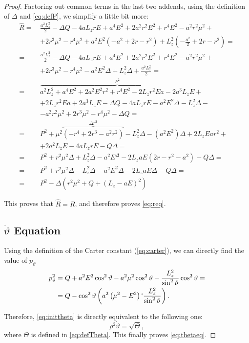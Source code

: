 \begin{proof}
	Factoring out common terms in the last two addends, using the definition of $\Delta$ and \autoref{eq:defP}, we simplify a little bit more:
	\begin{align}
	\widehat{R} =\,& \frac{a^2L_z^2}{2} - \Delta Q - 4aL_zrE + a^4E^2 + 2a^2r^2E^2 + r^4E^2 - a^2r^2\mu^2 + \nonumber \\
	&+ 2r^3\mu^2 - r^4\mu^2 + a^2E^2\left(-a^2 + 2r - r^2 \right) + L_z^2\left( -\frac{a^2}{2} + 2r - r^2 \right) = \nonumber \\
	=\,& \frac{a^2L_z^2}{2} - \Delta Q - 4aL_zrE + a^4E^2 + 2a^2r^2E^2 + r^4E^2 - a^2r^2\mu^2 + \nonumber \\
	&+ 2r^3\mu^2 - r^4\mu^2 - a^2E^2\Delta + L_z^2\Delta + \frac{a^2L_z^2}{2} = \nonumber \\
	=\,& \overbrace{a^2L_z^2 + a^4E^2 + 2a^2E^2r^2 + r^4E^2 - 2L_zr^2Ea - 2a^3L_zE}^{P^2} + \nonumber\\
	&+ 2L_zr^2Ea + 2a^3L_zE - \Delta Q - 4aL_zrE - a^2E^2\Delta - L_z^2\Delta - \nonumber \\
	&- a^2r^2\mu^2 + 2r^3\mu^2 - r^4\mu^2 - \Delta Q = \nonumber \\
	=\,& P^2 + \mu^2\overbrace{\left( -r^4 + 2r^3 - a^2r^2 \right)}^{\Delta r^2} - L_z^2\Delta - (a^2E^2)\Delta + 2L_zEar^2 + \nonumber\\
	&+ 2a^2L_zE - 4aL_zrE - Q\Delta = \nonumber\\
	=\,& P^2 + r^2\mu^2\Delta + L_z^2\Delta - a^2E^\Delta - 2L_zaE\left(2r - r^2 - a^2\right) - Q\Delta = \nonumber\\
	=\,& P^2 + r^2\mu^2\Delta - L_z^2 \Delta - a^2E^2\Delta - 2L_zaE\Delta - Q\Delta = \nonumber \\
	=\,& P^2 - \Delta \left( r^2\mu^2 + Q + \left(L_z - aE \right)^2 \right)
	\end{align}
	
	This proves that $\widehat{R} = R$, and therefore proves \autoref{eq:req}.
	
	\subsection*{$\dot{\vartheta}$ Equation}
	
	Using the definition of the Carter constant (\autoref{eq:carter}), we can directly find the value of $p_\vartheta$
	\begin{align}
	p_\vartheta^2 &= Q + a^2E^2\cos^2\vartheta - a^2\mu^2\cos^2\vartheta - \frac{L_z^2}{\sin^2\vartheta}\cos^2\vartheta = \\
	&= Q - \cos^2\vartheta\left( a^2\left(\mu^2 - E^2 \right) `\frac{L_z^2}{\sin^2\vartheta} \right).
	\end{align}
	
	Therefore, \autoref{eq:inittheta} is directly equivalent to the following one:
	\begin{equation}
	\rho^2 \dot{\vartheta} = \sqrt{\Theta},
	\end{equation}
	where $\Theta$ is defined in \autoref{eq:defTheta}. This finally proves \autoref{eq:thetaeq}.
\end{proof}

